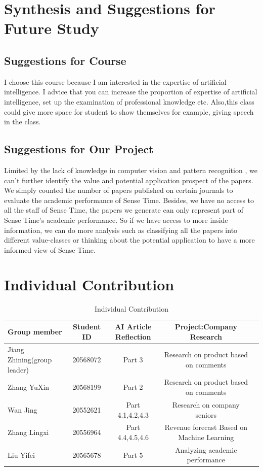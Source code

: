 \documentclass{article}
\begin{document}
\section{Synthesis and Suggestions for Future Study}
\subsection{Suggestions for Course}
I choose this course because I am interested in the expertise of artificial intelligence. I advice that you can increase the proportion of expertise of artificial intelligence, set up the examination of professional knowledge etc. Also,this class could give more space for student to show themselves for example, giving speech in the class. 
\subsection{Suggestions for Our Project}
Limited by the lack of  knowledge in computer vision and pattern recognition , we can’t further identify the value  and potential application prospect of the papers. We simply counted the number of papers published on certain journals to evaluate the academic performance of Sense Time. Besides, we have no access to all the staff of Sense Time, the papers we generate can only represent part of Sense Time’s academic performance. So if we have access to more inside information, we can do more analysis such as classifying all the papers into different value-classes or thinking about the potential application to have a more informed view of Sense Time.

\section{Individual Contribution}
\begin{table} [hbp]
    \caption{Individual Contribution} 
    \vspace{10pt}
    \centering
    \begin{tabular}[l]{@{}lcccc}
        \hline
        Group member & Student ID  & AI Article Reflection & Project:Company Research\\  
        \hline
        Jiang Zhining(group leader) &20568072 &Part 3 & Research on product based on comments
        \\
        Zhang YuXin & 20568199 & Part 2	& Research on product based on comments
        \\
        Wan Jing & 20552621	& Part 4.1,4.2,4.3 & Research on company seniors
        \\
        Zhang Lingxi & 20556964 & Part 4.4,4.5,4.6 & Revenue forecast Based on Machine Learning
        \\
        Liu Yifei & 20565678 & Part 5 & Analyzing academic performance
        \\
        \hline
    \end{tabular}  
\end{table} 
\end{document}
